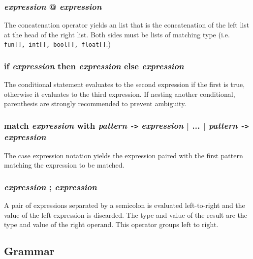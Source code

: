 \subsubsection{\textit{expression} @ \textit{expression}} 
The concatenation operator yields an list that is the concatenation of the left list at the head of the right list. Both sides must be lists of matching type (i.e. \texttt{fun[], int[], bool[], float[]}.) 

\subsubsection{if \textit{expression} then \textit{expression} else \textit{expression}}
The conditional statement evaluates to the second expression if the first is true, otherwise it evaluates to the third expression. If nesting another conditional, parenthesis are strongly recommended to prevent ambiguity.

\subsubsection{match \textit{expression} with \textit{pattern} \texttt{->} \textit{expression} | ... | \textit{pattern} \texttt{->} \textit{expression}}
The case expression notation yields the expression paired with the first pattern matching the expression to be matched. 

\subsubsection{\textit{expression} ; \textit{expression}}
A pair of expressions separated by a semicolon is evaluated left-to-right and the value of the left expression is discarded. The type and value of the result are the type and value of the right operand. This operator groups left to right. 

\newpage

\subsection{Grammar}

%
%
%
%
%
%
%
%
%

